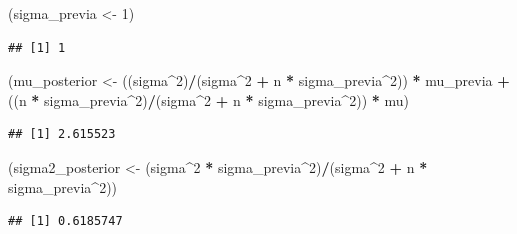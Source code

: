 \documentclass[
  12pt,
]{book}
\newenvironment{Shaded}{\begin{snugshade}}{\end{snugshade}}
\newcommand{\DecValTok}[1]{\textcolor[rgb]{0.00,0.00,0.81}{#1}}
\newcommand{\NormalTok}[1]{#1}
\newcommand{\OperatorTok}[1]{\textcolor[rgb]{0.81,0.36,0.00}{\textbf{#1}}}
\newcommand{\StringTok}[1]{\textcolor[rgb]{0.31,0.60,0.02}{#1}}
\begin{document}
\begin{Shaded}
\begin{Highlighting}[]
\NormalTok{(sigma\_previa \textless{}{-}}\StringTok{ }\DecValTok{1}\NormalTok{)}
\end{Highlighting}
\end{Shaded}

\begin{verbatim}
## [1] 1
\end{verbatim}

\begin{Shaded}
\begin{Highlighting}[]
\NormalTok{(mu\_posterior \textless{}{-}}\StringTok{ }\NormalTok{((sigma}\OperatorTok{\^{}}\DecValTok{2}\NormalTok{)}\OperatorTok{/}\NormalTok{(sigma}\OperatorTok{\^{}}\DecValTok{2} \OperatorTok{+}\StringTok{ }\NormalTok{n }\OperatorTok{*}\StringTok{ }\NormalTok{sigma\_previa}\OperatorTok{\^{}}\DecValTok{2}\NormalTok{)) }\OperatorTok{*}\StringTok{ }
\StringTok{    }\NormalTok{mu\_previa }\OperatorTok{+}\StringTok{ }\NormalTok{((n }\OperatorTok{*}\StringTok{ }\NormalTok{sigma\_previa}\OperatorTok{\^{}}\DecValTok{2}\NormalTok{)}\OperatorTok{/}\NormalTok{(sigma}\OperatorTok{\^{}}\DecValTok{2} \OperatorTok{+}\StringTok{ }\NormalTok{n }\OperatorTok{*}\StringTok{ }
\StringTok{    }\NormalTok{sigma\_previa}\OperatorTok{\^{}}\DecValTok{2}\NormalTok{)) }\OperatorTok{*}\StringTok{ }\NormalTok{mu)}
\end{Highlighting}
\end{Shaded}

\begin{verbatim}
## [1] 2.615523
\end{verbatim}

\begin{Shaded}
\begin{Highlighting}[]
\NormalTok{(sigma2\_posterior \textless{}{-}}\StringTok{ }\NormalTok{(sigma}\OperatorTok{\^{}}\DecValTok{2} \OperatorTok{*}\StringTok{ }\NormalTok{sigma\_previa}\OperatorTok{\^{}}\DecValTok{2}\NormalTok{)}\OperatorTok{/}\NormalTok{(sigma}\OperatorTok{\^{}}\DecValTok{2} \OperatorTok{+}\StringTok{ }
\StringTok{    }\NormalTok{n }\OperatorTok{*}\StringTok{ }\NormalTok{sigma\_previa}\OperatorTok{\^{}}\DecValTok{2}\NormalTok{))}
\end{Highlighting}
\end{Shaded}

\begin{verbatim}
## [1] 0.6185747
\end{verbatim}
\end{document}
